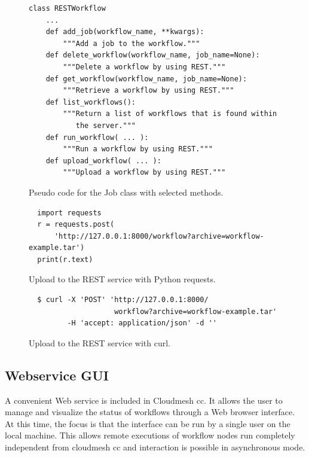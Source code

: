 \documentclass[sigplan,screen]{acmart}
\begin{document}
\begin{figure}[t]

{\scriptsize
\begin{verbatim}
class RESTWorkflow
    ...
    def add_job(workflow_name, **kwargs):
        """Add a job to the workflow."""
    def delete_workflow(workflow_name, job_name=None):
        """Delete a workflow by using REST."""
    def get_workflow(workflow_name, job_name=None):
        """Retrieve a workflow by using REST."""
    def list_workflows():
        """Return a list of workflows that is found within
           the server."""
    def run_workflow( ... ):
        """Run a workflow by using REST."""
    def upload_workflow( ... ):
        """Upload a workflow by using REST."""
\end{verbatim}}

\caption{Pseudo code for the Job class with selected methods.}
\label{fig:code-workflow-rest-commandline}

\bigskip

{\scriptsize
\begin{verbatim}
  import requests
  r = requests.post(
      'http://127.0.0.1:8000/workflow?archive=workflow-example.tar')
  print(r.text)
\end{verbatim}}

\caption{Upload to the REST service with Python requests.}
\label{fig:code-workflow-requests}

\bigskip

{\scriptsize
\begin{verbatim}
  $ curl -X 'POST' 'http://127.0.0.1:8000/ 
                    workflow?archive=workflow-example.tar'
         -H 'accept: application/json' -d ''
\end{verbatim}}%

\caption{Upload to the REST service with curl.}
\label{fig:code-workflow-curl}

\end{figure}


\subsection{Webservice GUI}

A convenient Web service is included in Cloudmesh cc. It allows the
user to manage and visualize the status of workflows through a Web
browser interface. At this time, the focus is that the interface can
be run by a single user on the local machine. This allows remote
executions of workflow nodes run completely independent from cloudmesh
cc and interaction is possible in asynchronous mode.
\end{document}
